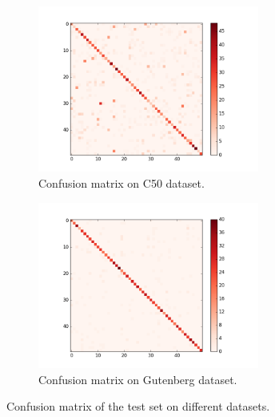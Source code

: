 \documentclass{article} %
\begin{document}
\begin{figure}[H]
\begin{subfigure}{0.5\linewidth}
\centering
\includegraphics[width=0.8\textwidth]{figures/confusion_matrix_C50_sentence.png} 
\caption{Confusion matrix on C50 dataset. }
\end{subfigure}
\begin{subfigure}{0.5\linewidth}
\centering
\includegraphics[width=0.8\textwidth]{figures/confusion_matrix_gutenberg_sentence.png} 
\caption{Confusion matrix on Gutenberg dataset.}
\end{subfigure}
\caption{Confusion matrix of the test set on different datasets.}
\label{fig: confusion_matrix}
\end{figure}
\end{document}
